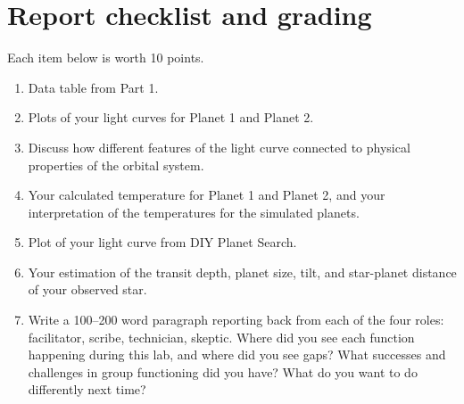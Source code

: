 \section{Report checklist and grading}

Each item below is worth 10 points.

\begin{enumerate}
	\item Data table from Part 1.
	
	\item Plots of your light curves for Planet 1 and Planet 2.
	
	\item Discuss how different features of the light curve connected to physical
	properties of the orbital system.
	
	\item Your calculated temperature for Planet 1 and Planet 2, and your interpretation of the
	temperatures for the simulated planets.
	
	\item Plot of your light curve from DIY Planet Search.
	
	\item Your estimation of the transit depth, planet size, tilt, and star-planet distance of your observed star.
	
	\item Write a 100--200 word paragraph reporting back from each of the four roles: facilitator, scribe, technician, skeptic. Where did you see each function happening during this lab, and where did you see gaps? What successes and challenges in group functioning did you have? What do you want to do differently next time?
\end{enumerate}